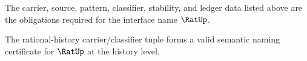 \begin{definition}
\label{def:rat-certificate-obligations}
The carrier, source, pattern, classifier, stability, and ledger data listed above are the obligations required for the interface name \(\RatUp\).
\end{definition}

\begin{theorem}
\label{thm:concrete-rat-namecert}
The rational-history carrier/classifier tuple forms a valid semantic naming certificate for $\RatUp$ at the history level.
\end{theorem}
